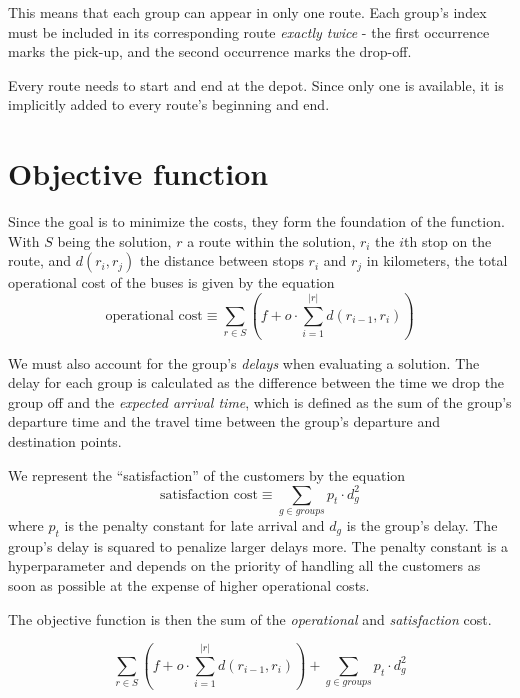 This means that each group can appear in only one route. Each group's index must be included in its corresponding route \textit{exactly twice} - the first occurrence marks the pick-up, and the second occurrence marks the drop-off.

Every route needs to start and end at the depot. Since only one is available, it is implicitly added to every route's beginning and end.

\section{Objective function}
\label{sec:objective}

Since the goal is to minimize the costs, they form the foundation of the function. With $S$ being the solution, $r$ a route within the solution, $r_i$ the $i$th stop on the route, and $d(r_i, r_j)$ the distance between stops $r_i$ and $r_j$ in kilometers, the total operational cost of the buses is given by the equation
\begin{equation}\label{eq:objective_costs}
    \text{operational cost} \equiv \sum_{r \in S} ( f + o \cdot \sum_{i=1}^{|r|}d(r_{i-1},r_{i}))
\end{equation}


We must also account for the group's \textit{delays} when evaluating a solution. The delay for each group is calculated as the difference between the time we drop the group off and the \textit{expected arrival time}, which is defined as the sum of the group's departure time and the travel time between the group’s departure and destination points.

We represent the ``satisfaction'' of the customers by the equation
\begin{equation}\label{eq:objective_satisfaction}
     \text{satisfaction cost} \equiv \sum_{g \in groups} p_t \cdot d_g^2
\end{equation}
where $p_t$ is the penalty constant for late arrival and $d_g$ is the group's delay. The group's delay is squared to penalize larger delays more. The penalty constant is a hyperparameter and depends on the priority of handling all the customers as soon as possible at the expense of higher operational costs.

The objective function is then the sum of the \textit{operational} and \textit{satisfaction} cost.

\begin{equation}\label{eq:objective}
    \sum_{r \in S} ( f + o \cdot \sum_{i=1}^{|r|}d(r_{i-1},r_{i})) + \sum_{g \in groups} p_t \cdot d_g^2
\end{equation}

